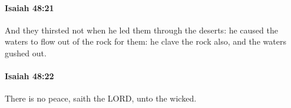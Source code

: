 		\paragraph{Isaiah 48:21} %
			\label{ISAIAH-48-21}

			And they thirsted not when he led them through the deserts: he caused the waters to flow out of the rock for them: he clave the rock also, and the waters gushed out.


		\paragraph{Isaiah 48:22} %
			\label{ISAIAH-48-22}

			There is no peace, saith the LORD, unto the wicked.

